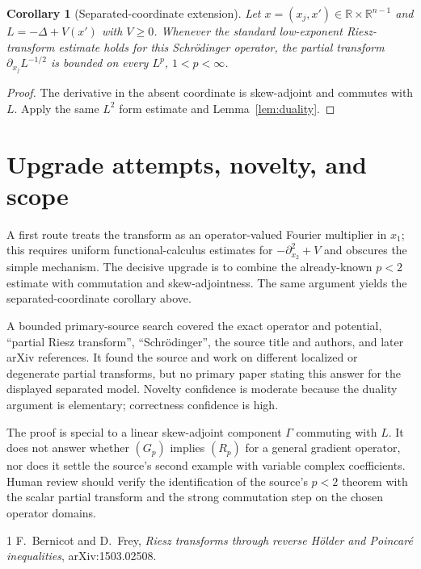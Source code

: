 \documentclass[11pt,a4paper]{article}
\newtheorem{corollary}[theorem]{Corollary}
\newcommand{\R}{\mathbb R}
\begin{document}
\begin{corollary}[Separated-coordinate extension]
Let $x=(x_j,x')\in\R\times\R^{n-1}$ and
$L=-\Delta+V(x')$ with $V\geq0$.  Whenever the standard low-exponent
Riesz-transform estimate holds for this Schr\"odinger operator, the partial
transform $\partial_{x_j}L^{-1/2}$ is bounded on every $L^p$,
$1<p<\infty$.
\end{corollary}

\begin{proof}
The derivative in the absent coordinate is skew-adjoint and commutes with
$L$.  Apply the same $L^2$ form estimate and Lemma~\ref{lem:duality}.
\end{proof}

\section{Upgrade attempts, novelty, and scope}

A first route treats the transform as an operator-valued Fourier multiplier
in $x_1$; this requires uniform functional-calculus estimates for
$-\partial_{x_2}^2+V$ and obscures the simple mechanism.  The decisive
upgrade is to combine the already-known $p<2$ estimate with commutation and
skew-adjointness.  The same argument yields the separated-coordinate
corollary above.

A bounded primary-source search covered the exact operator and potential,
``partial Riesz transform'', ``Schr\"odinger'', the source title and authors,
and later arXiv references.  It found the source and work on different
localized or degenerate partial transforms, but no primary paper stating this
answer for the displayed separated model.  Novelty confidence is moderate
because the duality argument is elementary; correctness confidence is high.

The proof is special to a linear skew-adjoint component $\Gamma$ commuting
with $L$.  It does not answer whether $(G_p)$ implies $(R_p)$ for a general
gradient operator, nor does it settle the source's second example with
variable complex coefficients.  Human review should verify the identification
of the source's $p<2$ theorem with the scalar partial transform and the strong
commutation step on the chosen operator domains.

\begin{thebibliography}{1}
F.~Bernicot and D.~Frey,
\emph{Riesz transforms through reverse H\"older and Poincar\'e inequalities},
arXiv:1503.02508.
\end{thebibliography}
\end{document}
